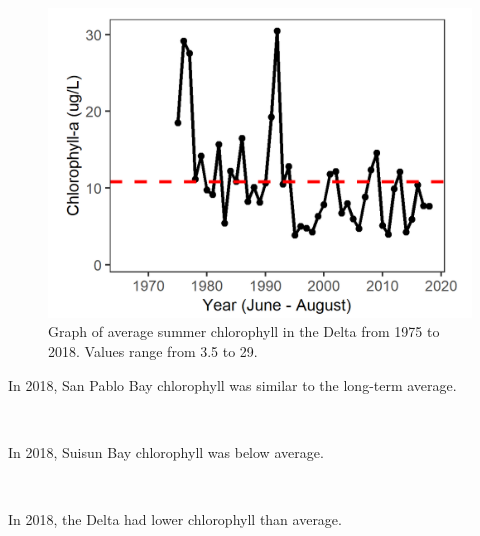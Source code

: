 \documentclass[
]{book}
\begin{document}
\begin{panel-grid}
\begin{columns-nocenter}
\begin{column800}
\begin{expand}
\begin{figure}
\includegraphics[width=15.25in]{figures/chla_dtsummer} \caption{Graph of average summer chlorophyll in the Delta from 1975 to 2018. Values range from 3.5 to 29.}\label{fig:unnamed-chunk-65}
\end{figure}

\end{expand}

\end{column800}

\end{columns-nocenter}

\begin{columns-nocenter}

\begin{column800}

In 2018, San Pablo Bay chlorophyll was similar to the long-term average.

\end{column800}

\begin{column40}

~

\end{column40}

\begin{column800}

In 2018, Suisun Bay chlorophyll was below average.

\end{column800}

\begin{column40}

~

\end{column40}

\begin{column800}

In 2018, the Delta had lower chlorophyll than average.

\end{column800}

\end{columns-nocenter}

\end{panel-grid}
\end{document}
